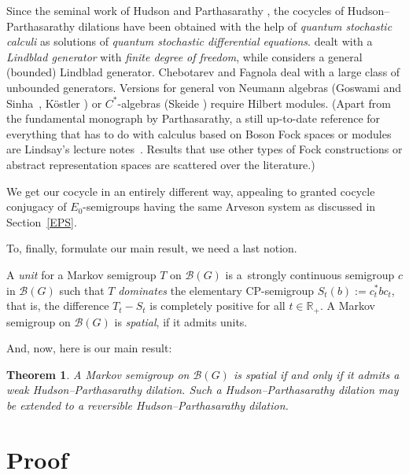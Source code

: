\documentclass[pdftex]{sigma}%
\newcommand{\eus}[1]{\mathscr{#1}}
\newcommand{\bb}[1]{\mathbb{#1}}
\newcommand{\R}{\bb{R}}
\newcommand{\sB}{\eus{B}}
\numberwithin{equation}{section}
\newtheorem{thm}{Theorem}[section]
\newcommand{\bdefi}{\begin{defi}}
\newcommand{\edefi}{\end{defi}}
\newcommand{\brem}{\begin{rem}}
\newcommand{\erem}{\end{rem}}
\newcommand{\bthm}{\begin{thm}}
\newcommand{\ethm}{\end{thm}}
\begin{document}
\brem \label{HPhisrem}
Since the seminal work of Hudson and Parthasarathy \cite{HuPa84,HuPa84a}, the cocycles of Hudson--Parthasarathy dilations have been obtained with the help of {\it quantum stochastic calculi} as solutions of {\it quantum stochastic differential equations}. \cite{HuPa84} dealt with a {\it Lindblad generator} with {\it finite degree of freedom}, while \cite{HuPa84a} considers a general (bounded) Lindblad generator. Chebotarev and Fagnola \cite{CheFa98} deal with a large class of unbounded generators. Versions for general von Neumann algebras (Goswami and Sinha~\cite{GoSi99}, K\"ostler \cite{Koes00}) or $C^*$-algebras (Skeide \cite{Ske00}) require Hilbert modules. (Apart from the fundamental monograph \cite{Par92} by Parthasarathy, a still up-to-date reference for everything that has to do with calculus based on Boson Fock spaces or modules are Lindsay's lecture notes~\cite{Lin05}. Results that use other types of Fock constructions or abstract representation spaces are scattered over the literature.)

We get our cocycle in an entirely different way, appealing to granted cocycle conjugacy of $E_0$-semigroups having the same Arveson system as discussed in Section~\ref{EPS}.
\erem

To, finally, formulate our main result, we need a last notion.

\bdefi[{Arveson \cite[Definition 2.1]{Arv97a}}]
A \emph{unit} for a Markov semigroup $T$ on $\sB(G)$ is a~strongly continuous semigroup $c$ in $\sB(G)$ such that $T$ \emph{dominates} the elementary CP-semigroup $S_t(b):=c_t^*bc_t$, that is, the difference $T_t-S_t$ is completely positive for all $t\in\R_+$. A Markov semigroup on $\sB(G)$ is \emph{spatial}, if it admits units.
\edefi

And, now, here is our main result:

\bthm \label{mthm}
A Markov semigroup on $\sB(G)$ is spatial if and only if it admits a weak Hudson--Partha\-sarathy dilation. Such a Hudson--Parthasarathy dilation may be extended to a reversible Hudson--Parthasarathy dilation.
\ethm

\section{Proof}\label{proofSEC}
\end{document}
